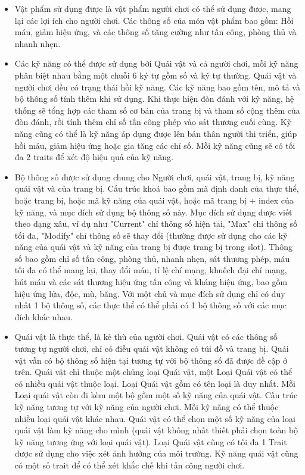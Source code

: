 \begin{itemize}
	\item Vật phẩm sử dụng được là vật phẩm người chơi có thể sử dụng được, mang lại các lợi ích cho người chơi. Các thông số của món vật phẩm bao gồm: Hồi máu, giảm hiệu ứng, và các thông số tăng cường như tấn công, phòng thủ và nhanh nhẹn.
	
	\item Các kỹ năng có thể được sử dụng bởi Quái vật và cả người chơi, mỗi kỹ năng phân biệt nhau bằng một chuỗi 6 ký tự gồm số và ký tự thường. Quái vật và người chơi đều có trạng thái hồi kỹ năng. Các kỹ năng bao gồm tên, mô tả và bộ thông số tính thêm khi sử dụng. Khi thực hiện đòn đánh với kỹ năng, hệ thống sẽ tổng hợp các tham số cơ bản của trang bị và tham số cộng thêm của đòn đánh, rồi tính thêm chỉ số tấn công phép vào sát thương cuối cùng. Kỹ năng cũng có thể là kỹ năng áp dụng được lên bản thân người thi triển, giúp hồi máu, giảm hiệu ứng hoặc gia tăng các chỉ số. Mỗi kỹ năng cũng sẽ có tối đa 2 traits để xét độ hiệu quả của kỹ năng.
	
	\item Bộ thông số được sử dụng chung cho Người chơi, quái vật, trang bị, kỹ năng quái vật và của trang bị. Cấu trúc khoá bao gồm mã định danh của thực thể, hoặc trang bị, hoặc mã kỹ năng của quái vật, hoặc mã trang bị + index của kỹ năng, và mục đích sử dụng bộ thông số này. Mục đích sử dụng được viết theo dạng xâu, ví dụ như "Current" chỉ thông số hiện tai, "Max" chỉ thông số tối đa, "Modify" chỉ thông số sẽ thay đổi (thường được sử dụng cho các kỹ năng của quái vật và kỹ năng của trang bị được trang bị trong slot). Thông số bao gồm chỉ số tấn công, phòng thủ, nhanh nhẹn, sát thương phép, máu tối đa có thể mang lại, thay đổi máu, tỉ lệ chí mạng, khuếch đại chí mạng, hút máu và các sát thương hiệu ứng tấn công và kháng hiệu ứng, bao gồm hiệu ứng lửa, độc, mù, băng. Với một chủ và mục đích sử dụng chỉ có duy nhất 1 bộ thông số, các thực thể có thể phải có 1 bộ thông số với các mục đích khác nhau. 
	
	\item Quái vật là thực thể, là kẻ thù của người chơi. Quái vật có các thông số tương tự người chơi, chỉ có điều quái vật không có túi đồ và trang bị. Quái vật vẫn có bộ thông số hiện tại tương tự với bộ thông số đã được đề cập ở trên. Quái vật chỉ thuộc một chủng loại Quái vật, một Loại Quái vật có thể có nhiều quái vật thuộc loại. Loại Quái vật gồm có tên loại là duy nhất. Mỗi Loại quái vật còn đi kèm một bộ gồm một số kỹ năng của quái vật. Cấu trúc kỹ năng tương tự với kỹ năng của người chơi. Mỗi kỹ năng có thể thuộc nhiều loại quái vật khác nhau. Quái vật có thể chọn một số kỹ năng của loại quái vật làm kỹ năng cho mình (quái vật không nhất thiết phải chọn toàn bộ kỹ năng tương ứng với loại quái vật). Loại Quái vật cũng có tối đa 1 Trait được sử dụng cho việc xét ảnh hưởng của môi trường. Kỹ năng quái vật cũng có một số trait để có thể xét khắc chế khi tấn công người chơi. 
	

\end{itemize}
